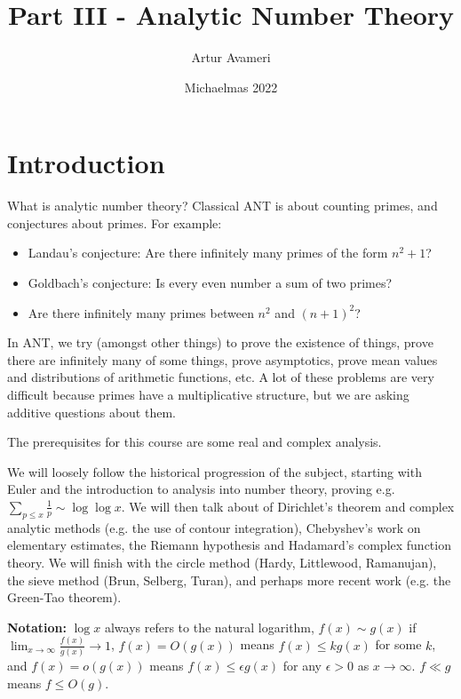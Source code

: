 \documentclass{article}
\title{Part III - Analytic Number Theory}
\author{Artur Avameri}
\date{Michaelmas 2022}
\theoremstyle{definition}
\theoremstyle{remark}
\begin{document}
\maketitle
\tableofcontents
\newpage

\section{Introduction}


What is analytic number theory? Classical ANT is about counting primes, and conjectures about primes. For example:
\begin{itemize}
    \item Landau's conjecture: Are there infinitely many primes of the form $n^2 +1$?
    \item Goldbach's conjecture: Is every even number a sum of two primes?
    \item Are there infinitely many primes between $n^2$ and $(n+1)^2$?
\end{itemize}

In ANT, we try (amongst other things) to prove the existence of things, prove there are infinitely many of some things, prove asymptotics, prove mean values and distributions of arithmetic functions, etc. A lot of these problems are very difficult because primes have a multiplicative structure, but we are asking additive questions about them.

The prerequisites for this course are some real and complex analysis. 

We will loosely follow the historical progression of the subject, starting with Euler and the introduction to analysis into number theory, proving e.g. $\sum_{p\le x}^{} \frac{1}{p} \sim \log \log x$. We will then talk about of Dirichlet's theorem and complex analytic methods (e.g. the use of contour integration), Chebyshev's work on elementary estimates, the Riemann hypothesis and Hadamard's complex function theory. We will finish with the circle method (Hardy, Littlewood, Ramanujan), the sieve method (Brun, Selberg, Turan), and perhaps more recent work (e.g. the Green-Tao theorem).

\vspace{1mm}

\textbf{Notation:}  $\log x$ always refers to the natural logarithm, $f(x) \sim g(x)$ if $\lim_{x \to \infty} \frac{f(x)}{g(x)} \to 1$, $f(x) = O(g(x))$ means $f(x) \le kg(x)$ for some $k$, and $f(x) = o(g(x))$ means $f(x) \le \epsilon g(x)$ for any $\epsilon>0$ as $x \to \infty$. $f \ll g$ means $f \le O(g)$.
\end{document}
